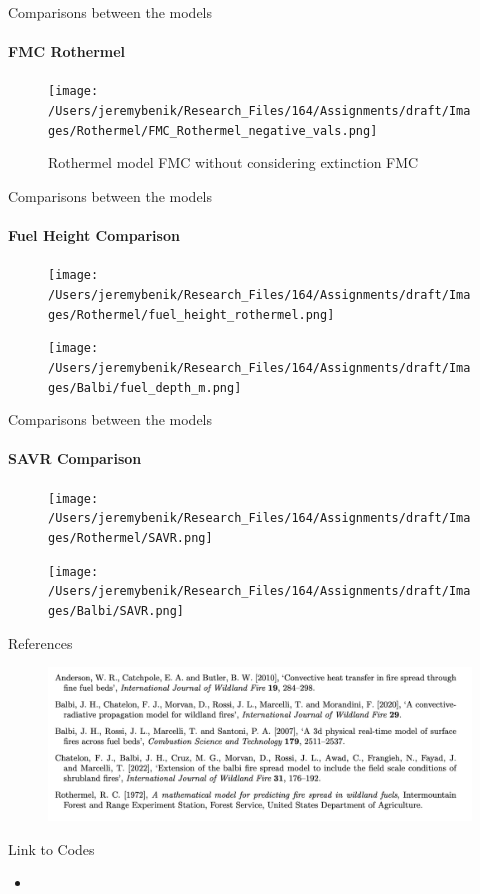 \documentclass{beamer}
\begin{document}
\begin{frame} {Comparisons between the models}
\framesubtitle{FMC Rothermel}
\begin{figure}[h]
\centering
  \texttt{[image: /Users/jeremybenik/Research\_Files/164/Assignments/draft/Images/Rothermel/FMC\_Rothermel\_negative\_vals.png]}
  \caption{Rothermel model FMC without considering extinction FMC}
  \label{Balbi_flame_diagram}
\end{figure}
\end{frame}

\begin{frame} {Comparisons between the models}
\framesubtitle{Fuel Height Comparison}
\begin{figure}
\centering
\begin{minipage}{.5\textwidth}
  \centering
  \texttt{[image: /Users/jeremybenik/Research\_Files/164/Assignments/draft/Images/Rothermel/fuel\_height\_rothermel.png]}
  \label{fig:test1}
\end{minipage}%
\begin{minipage}{.5\textwidth}
  \centering
  \texttt{[image: /Users/jeremybenik/Research\_Files/164/Assignments/draft/Images/Balbi/fuel\_depth\_m.png]}
  \label{fig:test2}
\end{minipage}
\end{figure}
\end{frame}

\begin{frame} {Comparisons between the models}
\framesubtitle{SAVR Comparison}
\begin{figure}
\centering
\begin{minipage}{.5\textwidth}
  \centering
  \texttt{[image: /Users/jeremybenik/Research\_Files/164/Assignments/draft/Images/Rothermel/SAVR.png]}
  \label{fig:test1}
\end{minipage}%
\begin{minipage}{.5\textwidth}
  \centering
  \texttt{[image: /Users/jeremybenik/Research\_Files/164/Assignments/draft/Images/Balbi/SAVR.png]}
  \label{fig:test2}
\end{minipage}
\end{figure}
\end{frame}


\begin{frame} {References}
\begin{figure}[h]
\centering
  \includegraphics[scale = 0.4]{bib.png}
  \end{figure}
\end{frame}

\begin{frame} {Link to Codes}
\begin{itemize}
	\item 
\end{itemize}
\end{frame}
\end{document}
